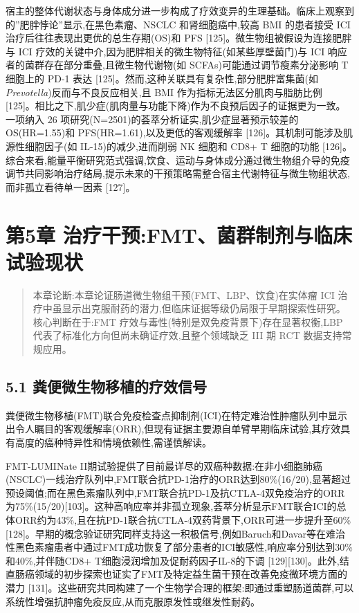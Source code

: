\documentclass[11pt]{article}
\begin{document}
宿主的整体代谢状态与身体成分进一步构成了疗效变异的生理基础。临床上观察到的''肥胖悖论''显示,在黑色素瘤、NSCLC 和肾细胞癌中,较高 BMI 的患者接受 ICI 治疗后往往表现出更优的总生存期(OS)和 PFS {[}125{]}。微生物组被假设为连接肥胖与 ICI 疗效的关键中介,因为肥胖相关的微生物特征(如某些厚壁菌门)与 ICI 响应者的菌群存在部分重叠,且微生物代谢物(如 SCFAs)可能通过调节瘦素分泌影响 T 细胞上的 PD-1 表达 {[}125{]}。然而,这种关联具有复杂性,部分肥胖富集菌(如\emph{Prevotella})反而与不良反应相关,且 BMI 作为指标无法区分肌肉与脂肪比例 {[}125{]}。相比之下,肌少症(肌肉量与功能下降)作为不良预后因子的证据更为一致。一项纳入 26 项研究(N=2501)的荟萃分析证实,肌少症显著预示较差的 OS(HR=1.55)和 PFS(HR=1.61),以及更低的客观缓解率 {[}126{]}。其机制可能涉及肌源性细胞因子(如 IL-15)的减少,进而削弱 NK 细胞和 CD8+ T 细胞的功能 {[}126{]}。综合来看,能量平衡研究范式强调,饮食、运动与身体成分通过微生物组介导的免疫调节共同影响治疗结局,提示未来的干预策略需整合宿主代谢特征与微生物组状态,而非孤立看待单一因素 {[}127{]}。

\section{第5章 治疗干预:FMT、菌群制剂与临床试验现状}\label{ux7b2c5ux7ae0-ux6cbbux7597ux5e72ux9884fmtux83ccux7fa4ux5236ux5242ux4e0eux4e34ux5e8aux8bd5ux9a8cux73b0ux72b6}

\begin{quote}
本章论断:本章论证肠道微生物组干预(FMT、LBP、饮食)在实体瘤 ICI 治疗中虽显示出克服耐药的潜力,但临床证据等级仍局限于早期探索性研究。核心判断在于:FMT 疗效与毒性(特别是双免疫背景下)存在显著权衡,LBP 代表了标准化方向但尚未确证疗效,且整个领域缺乏 III 期 RCT 数据支持常规应用。
\end{quote}

\subsection{5.1 粪便微生物移植的疗效信号}\label{ux7caaux4fbfux5faeux751fux7269ux79fbux690dux7684ux7597ux6548ux4fe1ux53f7}

粪便微生物移植(FMT)联合免疫检查点抑制剂(ICI)在特定难治性肿瘤队列中显示出令人瞩目的客观缓解率(ORR),但现有证据主要源自单臂早期临床试验,其疗效具有高度的癌种特异性和情境依赖性,需谨慎解读。

FMT-LUMINate II期试验提供了目前最详尽的双癌种数据:在非小细胞肺癌(NSCLC)一线治疗队列中,FMT联合抗PD-1治疗的ORR达到80\%(16/20),显著超过预设阈值;而在黑色素瘤队列中,FMT联合抗PD-1及抗CTLA-4双免疫治疗的ORR为75\%(15/20){[}103{]}。这种高响应率并非孤立现象,荟萃分析显示FMT联合ICI的总体ORR约为43\%,且在抗PD-1联合抗CTLA-4双药背景下,ORR可进一步提升至60\% {[}128{]}。早期的概念验证研究同样支持这一积极信号,例如Baruch和Davar等在难治性黑色素瘤患者中通过FMT成功恢复了部分患者的ICI敏感性,响应率分别达到30\%和40\%,并伴随CD8+ T细胞浸润增加及促耐药因子IL-8的下调 {[}129{]}{[}130{]}。此外,结直肠癌领域的初步探索也证实了FMT及特定益生菌干预在改善免疫微环境方面的潜力 {[}131{]}。这些研究共同构建了一个生物学合理的框架:即通过重塑肠道菌群,可以系统性增强抗肿瘤免疫反应,从而克服原发性或继发性耐药。
\end{document}
